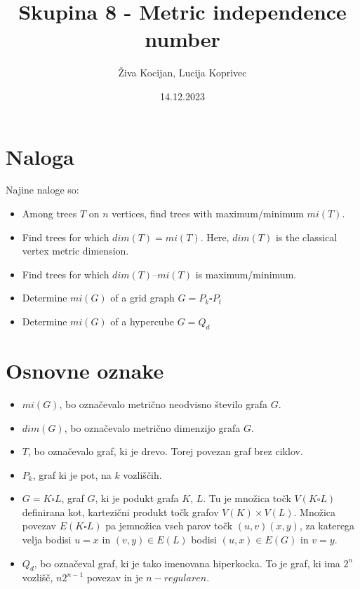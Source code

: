 \documentclass[a4paper]{article}
\title{Skupina 8 - Metric independence number}
\author{Živa Kocijan, Lucija Koprivec}
\date{14.12.2023}
\begin{document}
\maketitle

\section{Naloga}
Najine naloge so:
\begin{itemize}
  \item Among trees $T$ on $n$ vertices, find trees with maximum/minimum $mi(T)$.
  \item Find trees for which $dim(T) = mi(T)$. Here, $dim(T)$ is the classical vertex metric dimension.
  \item Find trees for which $dim(T)\text{--} mi(T)$ is maximum/minimum.
  \item Determine $mi(G)$ of a grid graph $G = P_{k} \square P_{t}$
  \item Determine $mi(G)$ of a hypercube $G = Q_{d}$
\end{itemize}

\section{Osnovne oznake}
\begin{itemize}
  \item $mi(G)$, bo označevalo metrično neodvisno število grafa $G$.
  \item $dim(G)$, bo označevalo metrično dimenzijo grafa $G$.
  \item $T$, bo označevalo graf, ki je drevo. Torej povezan graf brez ciklov.
  \item $P_{k}$, graf ki je pot, na $k$ vozliščih.
  \item $G = K \square L$, graf $G$, ki je podukt grafa $K$, $L$. Tu je množica točk $V(K \square L)$ definirana kot, kartezični  produkt točk grafov $V(K) \times V(L)$. Množica povezav $E(K \square L)$ pa jemnožica vseh parov točk $(u,v)(x,y)$, za katerega velja bodisi $u=x$ in $(v,y) \in E(L)$ bodisi $(u,x) \in E(G)$ in $v=y$.
  \item $Q_{d}$, bo označeval graf, ki je tako imenovana hiperkocka. To je graf, ki ima $2^{n}$ vozlišč, $n2^{n-1}$ povezav in je $n-regularen$.
\end{itemize}
\end{document}
